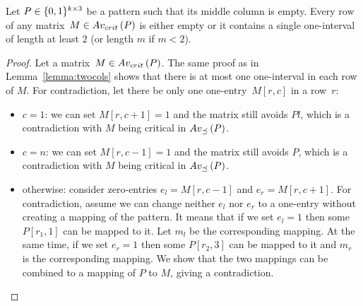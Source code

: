 \begin{lemma}
\label{lemma:maxmult}
Let $P\in\{0,1\}^{k\times3}$ be a pattern such that its middle column is empty. Every row of any matrix~$M\in Av_{crit}\left(P\right)$ is either empty or it contains a single one-interval of length at least $2$ (or length $m$ if $m<2$).
\end{lemma}
\begin{proof}
Let a matrix~$M\in Av_{crit}\left(P\right)$. The same proof as in Lemma~\ref{lemma:twocols} shows that there is at most one one-interval in each row of $M$. For contradiction, let there be only one one-entry~$M[r,c]$ in a row~$r$:
\begin{itemize}
	\item $c=1$: we can set $M[r,c+1]=1$ and the matrix still avoids $Pl$, which is a contradiction with $M$ being critical in $Av_{\preceq}\left(P\right)$.
	\item $c=n$: we can set $M[r,c-1]=1$ and the matrix still avoids $P$, which is a contradiction with $M$ being critical in $Av_{\preceq}\left(P\right)$.
	\item otherwise: consider zero-entries $e_l=M[r,c-1]$ and $e_r=M[r,c+1]$. For contradiction, assume we can change neither $e_l$ nor $e_r$ to a one-entry without creating a mapping of the pattern. It means that if we set $e_l=1$ then some $P[r_1,1]$ can be mapped to it. Let $m_l$ be the corresponding mapping. At the same time, if we set $e_r=1$ then some $P[r_2,3]$ can be mapped to it and $m_r$ is the corresponding mapping. We show that the two mappings can be combined to a mapping of $P$ to $M$, giving a contradiction.
	

\end{itemize}
\end{proof}
